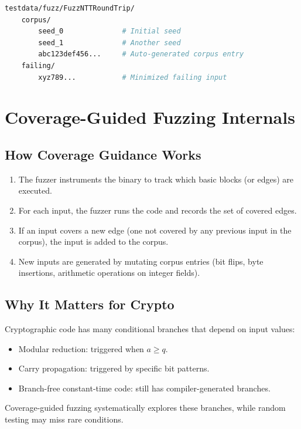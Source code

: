 \documentclass[11pt,a4paper]{article}
\begin{document}
\begin{lstlisting}[language=bash,caption={Corpus directory structure}]
testdata/fuzz/FuzzNTTRoundTrip/
    corpus/
        seed_0              # Initial seed
        seed_1              # Another seed
        abc123def456...     # Auto-generated corpus entry
    failing/
        xyz789...           # Minimized failing input
\end{lstlisting}

\section{Coverage-Guided Fuzzing Internals}

\subsection{How Coverage Guidance Works}

\begin{enumerate}[nosep]
  \item The fuzzer instruments the binary to track which basic blocks (or edges) are
    executed.
  \item For each input, the fuzzer runs the code and records the set of covered edges.
  \item If an input covers a new edge (one not covered by any previous input in the
    corpus), the input is added to the corpus.
  \item New inputs are generated by mutating corpus entries (bit flips, byte insertions,
    arithmetic operations on integer fields).
\end{enumerate}

\subsection{Why It Matters for Crypto}

Cryptographic code has many conditional branches that depend on input values:
\begin{itemize}[nosep]
  \item Modular reduction: triggered when $a \geq q$.
  \item Carry propagation: triggered by specific bit patterns.
  \item Branch-free constant-time code: still has compiler-generated branches.
\end{itemize}

Coverage-guided fuzzing systematically explores these branches, while random testing
may miss rare conditions.
\end{document}
